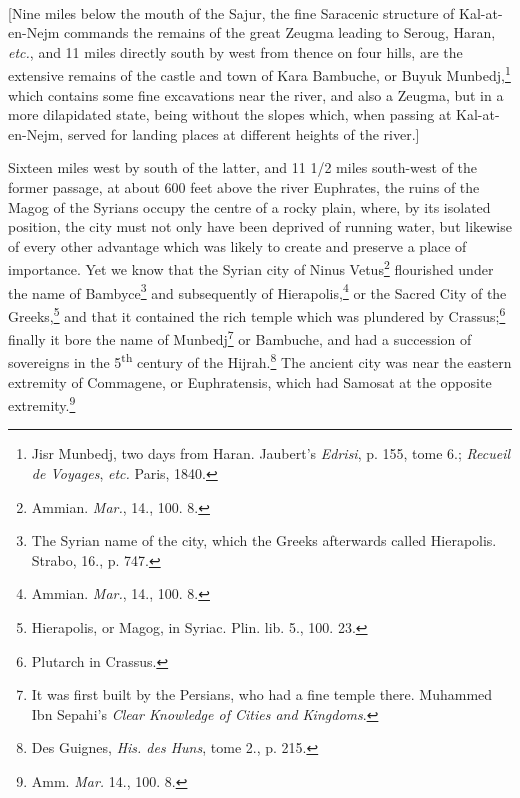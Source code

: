 \documentclass[a4paper, 11pt, oneside, polutonikogreek, english]{article}
\begin{document}
\paragraph{}
[Nine miles below the mouth of the Sajur, the fine Saracenic structure of Kal-at-en-Nejm commands the remains of the great Zeugma leading to Seroug, Haran, \emph{etc.}, and 11 miles directly south by west from thence on four hills, are the extensive remains of the castle and town of Kara Bambuche, or Buyuk Munbedj,\footnote{Jisr Munbedj, two days from Haran. Jaubert's \emph{Edrisi}, p. 155, tome 6.; \emph{Recueil de Voyages}, \emph{etc.} Paris, 1840.} which contains some fine excavations near the river, and also a Zeugma, but in a more dilapidated state, being without the slopes which, when passing at Kal-at-en-Nejm, served for landing places at different heights of the river.]

Sixteen miles west by south of the latter, and 11 1/2 miles south-west of the former passage, at about 600 feet above the river Euphrates, the ruins of the Magog of the Syrians occupy the centre of a rocky plain, where, by its isolated position, the city must not only have been deprived of running water, but likewise of every other advantage which was likely to create and preserve a place of importance. Yet we know that the Syrian city of Ninus Vetus\footnote{Ammian. \emph{Mar.}, 14., 100. 8.} flourished under the name of Bambyce\footnote{The Syrian name of the city, which the Greeks afterwards called Hierapolis. Strabo, 16., p. 747.} and subsequently of Hierapolis,\footnote{Ammian. \emph{Mar.}, 14., 100. 8.} or the Sacred City of the Greeks,\footnote{Hierapolis, or Magog, in Syriac. Plin. lib. 5., 100. 23.} and that it contained the rich temple which was plundered by Crassus;\footnote{Plutarch in Crassus.} finally it bore the name of Munbedj\footnote{It was first built by the Persians, who had a fine temple there. Muhammed Ibn Sepahi's \emph{Clear Knowledge of Cities and Kingdoms}.} or Bambuche, and had a succession of sovereigns in the 5\textsuperscript{th} century of the Hijrah.\footnote{Des Guignes, \emph{His. des Huns}, tome 2., p. 215.} The ancient city was near the eastern extremity of Commagene, or Euphratensis, which had Samosat at the opposite extremity.\footnote{Amm. \emph{Mar.} 14., 100. 8.}
\end{document}
